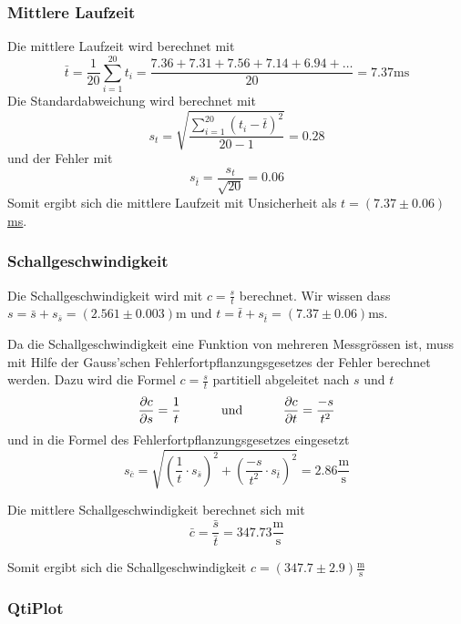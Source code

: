 \subsubsection*{Mittlere Laufzeit}

Die mittlere Laufzeit wird berechnet mit
\[ \bar{t} = \frac{1}{20} \sum_{i=1}^{20} t_i = \frac{7.36+7.31+7.56+7.14+6.94+\ldots}{20} = 7.37 \textrm{ms} \]
Die Standardabweichung wird berechnet mit
\[ s_t = \sqrt{ \frac{ \sum_{i=1}^{20} (t_i - \bar{t})^2 }{20-1} } = 0.28\]
und der Fehler mit
\[ s_{\bar{t}} = \frac{s_t}{\sqrt{20}} = 0.06 \]
Somit ergibt sich die mittlere Laufzeit mit Unsicherheit als \underline{\underline{$t = (7.37 \pm 0.06)$ ms}}.


\subsubsection*{Schallgeschwindigkeit}

Die Schallgeschwindigkeit wird mit $c=\frac{s}{t}$ berechnet. Wir wissen dass
$s=\bar{s}+s_{\bar{s}}=(2.561\pm0.003) \textrm{m}$
und
$t=\bar{t}+s_{\bar{t}}=(7.37\pm0.06) \textrm{ms}$.

Da die Schallgeschwindigkeit eine Funktion von mehreren Messgr\"ossen ist, muss mit Hilfe der
Gauss'schen Fehlerfortpflanzungsgesetzes der Fehler berechnet werden. Dazu wird die Formel $c=\frac{s}{t}$
partitiell abgeleitet nach $s$ und $t$
\[ \frac{\partial c}{\partial s} = \frac{1}{t} \textrm{\hspace{10mm} und \hspace{10mm}} \frac{\partial c}{\partial{t}} = \frac{-s}{t^2} \]
und in die Formel des Fehlerfortpflanzungsgesetzes eingesetzt
\[ s_{\bar{c}} = \sqrt{(\frac{1}{t} \cdot s_{\bar{s}})^2 + (\frac{-s}{t^2} \cdot s_{\bar{t}})^2} = 2.86 \frac{\textrm{m}}{\textrm{s}} \]

Die mittlere Schallgeschwindigkeit berechnet sich mit
\[ \bar{c}=\frac{\bar{s}}{\bar{t}} = 347.73 \frac{\textrm{m}}{\textrm{s}} \]

Somit ergibt sich die Schallgeschwindigkeit
\underline{\underline{$c=(347.7 \pm 2.9) \frac{\textrm{m}}{\textrm{s}}$}}


\subsubsection*{QtiPlot}


